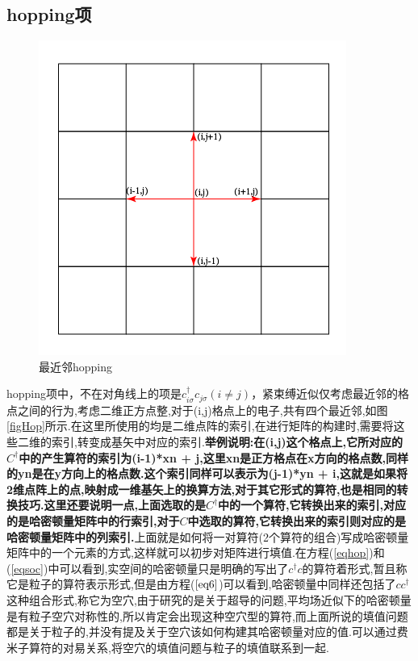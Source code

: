 \documentclass[a4paper,12pt]{ctexart}
\numberwithin{equation}{section}
\begin{document}
\subsection{hopping项}
\begin{figure}[h]
\centering
\includegraphics[scale=0.5]{SqLattice.png}
\caption{最近邻hopping}
\end{figure}\label{figHop}
hopping项中，不在对角线上的项是$c_{i\sigma}^\dagger c_{j\sigma}(i\neq j)$，紧束缚近似仅考虑最近邻的格点之间的行为,考虑二维正方点整,对于(i,j)格点上的电子,共有四个最近邻,如图\ref{figHop}所示.在这里所使用的均是二维点阵的索引,在进行矩阵的构建时,需要将这些二维的索引,转变成基矢中对应的索引.\textbf{举例说明:在(i,j)这个格点上,它所对应的$C^\dagger$中的产生算符的索引为(i-1)*xn + j,这里xn是正方格点在x方向的格点数,同样的yn是在y方向上的格点数.这个索引同样可以表示为(j-1)*yn + i,这就是如果将2维点阵上的点,映射成一维基矢上的换算方法,对于其它形式的算符,也是相同的转换技巧.这里还要说明一点,上面选取的是$C^\dagger$中的一个算符,它转换出来的索引,对应的是哈密顿量矩阵中的行索引,对于$C$中选取的算符,它转换出来的索引则对应的是哈密顿量矩阵中的列索引.}上面就是如何将一对算符(2个算符的组合)写成哈密顿量矩阵中的一个元素的方式,这样就可以初步对矩阵进行填值.在方程(\ref{eqhop})和(\ref{eqsoc})中可以看到,实空间的哈密顿量只是明确的写出了$c^\dagger c$的算符着形式,暂且称它是粒子的算符表示形式,但是由方程($\ref{eq6}$)可以看到,哈密顿量中同样还包括了$cc^\dagger$这种组合形式,称它为空穴,由于研究的是关于超导的问题,平均场近似下的哈密顿量是有粒子空穴对称性的,所以肯定会出现这种空穴型的算符,而上面所说的填值问题都是关于粒子的,并没有提及关于空穴该如何构建其哈密顿量对应的值.可以通过费米子算符的对易关系,将空穴的填值问题与粒子的填值联系到一起.
\end{document}
